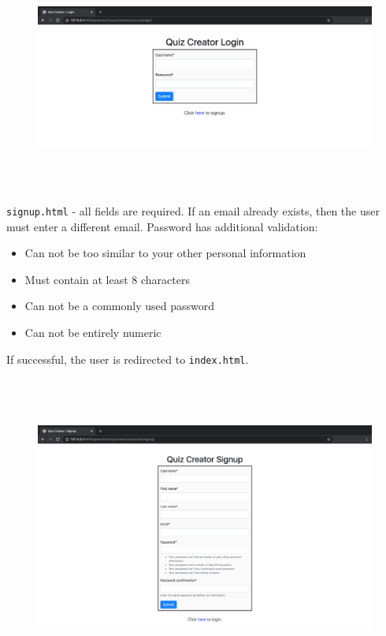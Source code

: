 \documentclass{article}
\begin{document}
\begin{figure}[H]
  \includegraphics[width=175mm, height=75mm]{./img/12-expected-quiz-1.png}
\end{figure}

\texttt{signup.html} - all fields are required. If an email already exists, then the user must enter a different email. Password has additional validation:
\begin{itemize}
  \item Can not be too similar to your other personal information
  \item Must contain at least 8 characters
  \item Can not be a commonly used password
  \item Can not be entirely numeric
\end{itemize}

If successful, the user is redirected to  \texttt{index.html}. 

\begin{figure}[H]
  \includegraphics[width=175mm, height=100mm]{./img/12-expected-quiz-2.png}   
\end{figure}
\end{document}
